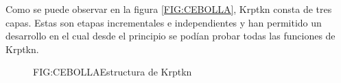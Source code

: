 Como se puede observar en la figura \ref{FIG:CEBOLLA}, Krptkn consta de tres capas. Estas son etapas incrementales e independientes y han permitido un desarrollo en el cual desde el principio se podían probar todas las funciones de Krptkn.

\begin{figure}[cebolla]{FIG:CEBOLLA}{Estructura de Krptkn}
\end{figure}